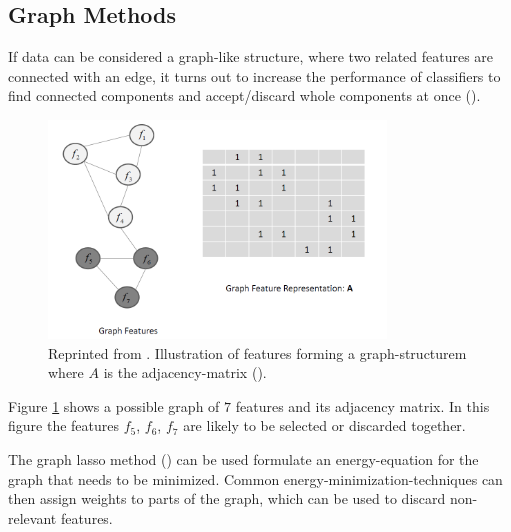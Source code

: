 \subsection{Graph Methods}
\label{sec:methods.structured.graph}


If data can be considered a graph-like structure, where two related features are
connected with an edge, it turns out to increase the performance of classifiers
to find connected components and accept/discard whole components at once
(\cite{Jacob:09}). 

\begin{figure}[!ht]
  \centering 
  \includegraphics[width=0.8\textwidth]{chapters/methods/structured/graph_lasso}
  \caption{Reprinted from \cite{Tang:04}. Illustration of features forming a
  graph-structurem where $A$ is the adjacency-matrix (\cite{Tang:04}).}
  \label{fig:methods.structured.graph.lasso}
\end{figure}

Figure \ref{fig:methods.structured.graph.lasso} shows a
possible graph of $7$ features and its adjacency matrix. In this figure the
features $f_5$, $f_6$, $f_7$ are likely to be selected or discarded together.

The graph lasso method (\cite{Jacob:09}) can be used formulate an
energy-equation for the graph that needs to be minimized. Common
energy-minimization-techniques can then assign weights to parts of the graph,
which can be used to discard non-relevant features.
